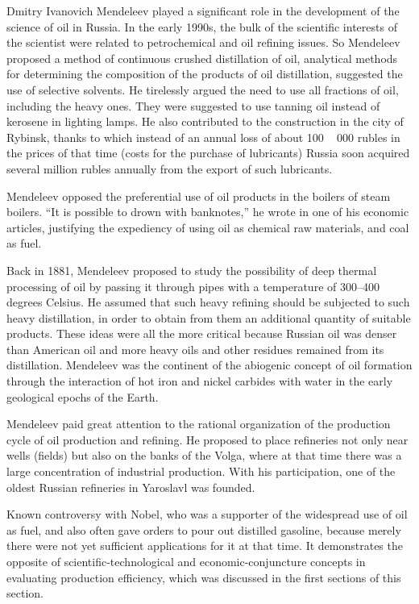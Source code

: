 \documentclass[12pt]{report}
\theoremstyle{definition}
\begin{document}
Dmitry Ivanovich Mendeleev played a significant role in the development of the science of oil in Russia.
In the early 1990s, the bulk of the scientific interests of the scientist were related to petrochemical and oil refining issues.
So Mendeleev proposed a method of continuous crushed distillation of oil, analytical methods for determining the composition of the products of oil distillation, suggested the use of selective solvents.
He tirelessly argued the need to use all fractions of oil, including the heavy ones.
They were suggested to use tanning oil instead of kerosene in lighting lamps.
He also contributed to the construction in the city of Rybinsk, thanks to which instead of an annual loss of about 100 ~ 000 rubles in the prices of that time (costs for the purchase of lubricants) Russia soon acquired several million rubles annually from the export of such lubricants.

Mendeleev opposed the preferential use of oil products in the boilers of steam boilers.
``It is possible to drown with banknotes,'' he wrote in one of his economic articles, justifying the expediency of using oil as chemical raw materials, and coal as fuel.

Back in 1881, Mendeleev proposed to study the possibility of deep thermal processing of oil by passing it through pipes with a temperature of 300--400 degrees Celsius.
He assumed that such heavy refining should be subjected to such heavy distillation, in order to obtain from them an additional quantity of suitable products.
These ideas were all the more critical because Russian oil was denser than American oil and more heavy oils and other residues remained from its distillation.
Mendeleev was the continent of the abiogenic concept of oil formation through the interaction of hot iron and nickel carbides with water in the early geological epochs of the Earth.

Mendeleev paid great attention to the rational organization of the production cycle of oil production and refining.
He proposed to place refineries not only near wells (fields) but also on the banks of the Volga, where at that time there was a large concentration of industrial production.
With his participation, one of the oldest Russian refineries in Yaroslavl was founded.

Known controversy with Nobel, who was a supporter of the widespread use of oil as fuel, and also often gave orders to pour out distilled gasoline, because merely
there were not yet sufficient applications for it at that time. It demonstrates the opposite of scientific-technological and economic-conjuncture concepts in evaluating production efficiency, which was discussed in the first sections of this section.
\end{document}
